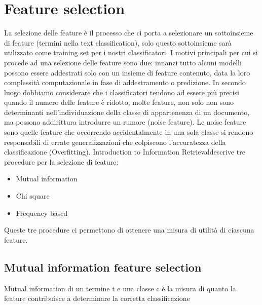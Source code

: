 \documentclass{article}
\theoremstyle{plain}
\theoremstyle{definition}
\begin{document}
\newpage
\section{Feature selection}
La selezione delle feature è il processo che ci porta a selezionare un sottoinsieme di feature (termini nella text classification), solo questo sottoinsieme sarà utilizzato come training set per i nostri classificatori.
I motivi principali per cui si procede ad una selezione delle feature sono due: innanzi tutto alcuni modelli possono essere addestrati solo con un insieme di feature  contenuto, data la loro complessità computazionale in fase di addestramento o predizione. In secondo luogo dobbiamo considerare che i classificatori tendono ad essere più precisi quando il numero delle feature è ridotto, molte feature, non solo non sono determinanti nell'individuazione della classe di appartenenza di un documento, ma possono addirittura introdurre un rumore (noise feature). Le noise feature sono quelle feature che occorrendo accidentalmente in una sola classe si rendono responsabili di errate generalizzazioni che colpiscono l'accuratezza della classificazione (Overfitting).
Introduction to Information Retrieval\footnotemark descrive tre procedure per la selezione di feature:
\begin{itemize}  
\item Mutual information
\item Chi square
\item Frequency based
\end{itemize}
Queste tre procedure ci permettono di ottenere una misura di utilità di ciascuna feature.


\subsection{Mutual information feature selection}
Mutual information di un termine t e una classe c è la misura di quanto la feature contribuisce a determinare la corretta classificazione
\end{document}
